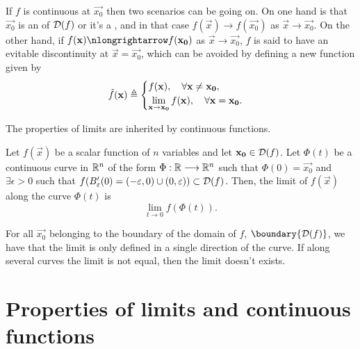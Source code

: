 \begin{note}
    If $f$ is continuous at $\vec{x_0}$ then two scenarios can be going on. On one hand is that $\vec{x_0}$ is an 
     of $\dom{f}$ or it's a , and in that case $f(\vec{x})\longrightarrow
    f(\vec{x_0})$ as $\vec{x}\longrightarrow\vec{x_0}$. On the other hand, if $f(\vec{x})\nlongrightarrow
    f(\vec{x_0})$ as $\vec{x}\longrightarrow\vec{x_0}$, $f$ is said to have an evitable discontinuity at $\vec{x} = \vec{x_0}$,
    which can be avoided by defining a new function given by
    \begin{equation}
        \tilde{f}(\vec{x})\bydef\begin{cases}
            f(\vec{x}),\quad\forall\vec{x}\neq\vec{x_0}, \\
            \lim_{\vec{x}\to\vec{x_0}} f(\vec{x}),\quad\forall\vec{x} = \vec{x_0}.
        \end{cases}
    \end{equation}
\end{note}

\begin{note}
    The properties of limits are inherited by continuous functions.
\end{note}

\begin{defn}
    Let $f(\vec{x})$ be a scalar function of $n$ variables and let $\vec{x_0}\in\dom{f}$. Let $\Phi(t)$ be a continuous
    curve in $\Rtn$ of the form $\appl{\Phi}{\R}{\Rtn}$ such that $\Phi(0) = \vec{x_0}$ and $\exists\epsilon > 0$ such that
    $f(B'_{\epsilon}\argp{0} = (-\epsilon, 0)\cup(0, \epsilon))\subset\dom{f}$. Then, the limit of $f(\vec{x})$ along the 
    curve $\Phi(t)$ is
    \begin{equation}
        \lim_{t\to 0} f(\Phi(t)).
    \end{equation}
\end{defn}

\begin{note}
    For all $\vec{x_0}$ belonging to the boundary of the domain of $f$, $\boundary{\dom{f}}$, we have that the limit is only
    defined in a single direction of the curve. If along several curves the limit is not equal, then the limit doesn't exists.
\end{note}

\section{Properties of limits and continuous functions}

